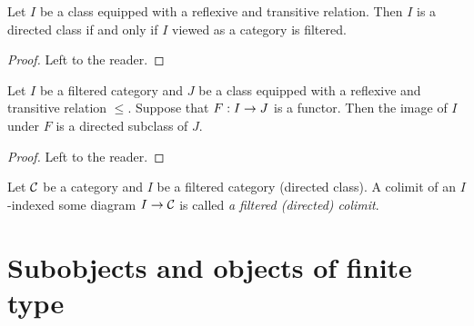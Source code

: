 \begin{fact}\label{fact:filteredisgeneralizationofdirected}
Let $I$ be a class equipped with a reflexive and transitive relation. Then $I$ is a directed class if and only if $I$ viewed as a category is filtered.
\end{fact}
\begin{proof}
Left to the reader.
\end{proof}

\begin{fact}\label{fact:imageoffilteredinclass}
Let $I$ be a filtered category and $J$ be a class equipped with a reflexive and transitive relation $\leq$. Suppose that $F:I\rightarrow J$ is a functor. Then the image of $I$ under $F$ is a directed subclass of $J$.
\end{fact}
\begin{proof}
Left to the reader.
\end{proof}

\begin{definition}
Let ${\mathcal C}$ be a category and $I$ be a filtered category (directed class). A colimit of an $I$-indexed some diagram $I\rightarrow {\mathcal C}$ is called \textit{a filtered (directed) colimit}.
\end{definition}

\section{Subobjects and objects of finite type}

